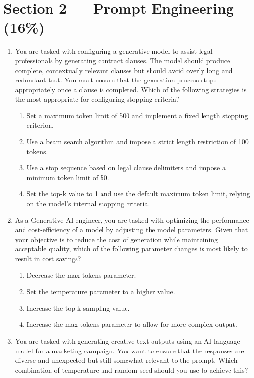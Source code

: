 \section*{Section 2 --- Prompt Engineering (16\%)}

\begin{enumerate}[resume,leftmargin=*]
\item You are tasked with configuring a generative model to assist legal professionals by generating contract clauses. The model should produce complete, contextually relevant clauses but should avoid overly long and redundant text. You must ensure that the generation process stops appropriately once a clause is completed. Which of the following strategies is the most appropriate for configuring stopping criteria?
\begin{enumerate}[label=\Alph*.]
  \item Set a maximum token limit of 500 and implement a fixed length stopping criterion.
  \item Use a beam search algorithm and impose a strict length restriction of 100 tokens.
  \item Use a stop sequence based on legal clause delimiters and impose a minimum token limit of 50.
  \item Set the top-k value to 1 and use the default maximum token limit, relying on the model's internal stopping criteria.
\end{enumerate}
\item As a Generative AI engineer, you are tasked with optimizing the performance and cost-efficiency of a model by adjusting the model parameters. Given that your objective is to reduce the cost of generation while maintaining acceptable quality, which of the following parameter changes is most likely to result in cost savings?
\begin{enumerate}[label=\Alph*.]
  \item Decrease the max tokens parameter.
  \item Set the temperature parameter to a higher value.
  \item Increase the top-k sampling value.
  \item Increase the max tokens parameter to allow for more complex output.
\end{enumerate}
\item You are tasked with generating creative text outputs using an AI language model for a marketing campaign. You want to ensure that the responses are diverse and unexpected but still somewhat relevant to the prompt. Which combination of temperature and random seed should you use to achieve this?

\end{enumerate}
